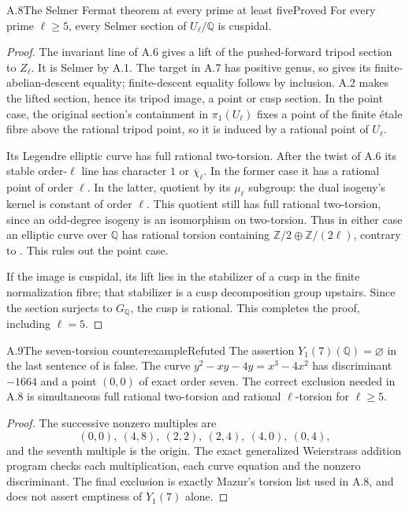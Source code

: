 \begin{statement}{A.8}{The Selmer Fermat theorem at every prime at least five}{Proved}
For every prime $\ell\geq5$, every Selmer section of $U_\ell/\mathbb Q$
is cuspidal.
\end{statement}
\begin{proof}
The invariant line of A.6 gives a lift of the pushed-forward tripod
section to $Z_\ell$. It is Selmer by A.1. The target in A.7 has positive
genus, so \citet[Corollary 8.8]{AMStoll2007} gives its finite-abelian-descent
equality; finite-descent equality follows by inclusion. A.2 makes the
lifted section, hence its tripod image, a point or cusp section. In the
point case, the original section's containment in $\pi_1(U_\ell)$ fixes
a point of the finite \'etale fibre above the rational tripod point, so it
is induced by a rational point of $U_\ell$.

Its Legendre elliptic curve has full rational two-torsion. After the twist
of A.6 its stable order-$\ell$ line has character $1$ or
$\overline\chi_\ell$. In the former case it has a rational point of
order $\ell$. In the latter, quotient by its $\mu_\ell$ subgroup: the
dual isogeny's kernel is constant of order $\ell$. This quotient still
has full rational two-torsion, since an odd-degree isogeny is an
isomorphism on two-torsion. Thus in either case an elliptic curve over
$\mathbb Q$ has rational torsion containing
$\mathbb Z/2\oplus\mathbb Z/(2\ell)$, contrary to
\citet[Theorem (8)]{AMMazur1977}. This rules out the point case.

If the image is cuspidal, its lift lies in the stabilizer of a cusp in the
finite normalization fibre; that stabilizer is a cusp decomposition group
upstairs. Since the section surjects to $G_{\mathbb Q}$, the cusp is
rational. This completes the proof, including $\ell=5$.
\end{proof}

\begin{statement}{A.9}{The seven-torsion counterexample}{Refuted}
The assertion $Y_1(7)(\mathbb Q)=\varnothing$ in the last sentence of
\citet[Theorem 5.14]{AMSteklov2026} is false. The curve
$y^2-xy-4y=x^3-4x^2$ has discriminant $-1664$ and a point $(0,0)$ of
exact order seven. The correct exclusion needed in A.8 is simultaneous
full rational two-torsion and rational $\ell$-torsion for $\ell\geq5$.
\end{statement}
\begin{proof}
The successive nonzero multiples are
\[
 (0,0),\ (4,8),\ (2,2),\ (2,4),\ (4,0),\ (0,4),
\]
and the seventh multiple is the origin. The exact generalized
Weierstrass addition program checks each multiplication, each curve
equation and the nonzero discriminant. The final exclusion is exactly
Mazur's torsion list used in A.8, and does not assert emptiness of
$Y_1(7)$ alone.
\end{proof}

